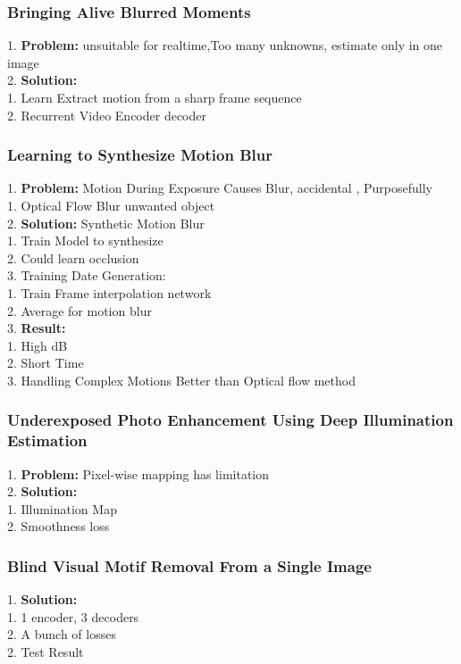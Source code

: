 \subsubsection{Bringing Alive Blurred Moments}
    1. {\bf Problem:} unsuitable for realtime,Too many unknowns, estimate only in one image \\
    2. {\bf Solution:} \\
        1. Learn Extract motion from a sharp frame sequence \\
        2. Recurrent Video Encoder decoder \\
\subsubsection{Learning to Synthesize Motion Blur}
    1. {\bf Problem:} Motion During Exposure Causes Blur, accidental , Purposefully  \\
        1. Optical Flow Blur unwanted object  \\
    2. {\bf Solution:} Synthetic Motion Blur \\
        1. Train Model to synthesize \\
        2. Could learn occlusion \\
        3. Training Date Generation: \\
            1. Train Frame interpolation network \\
            2. Average for motion blur \\
    3. {\bf Result:} \\
        1. High dB \\
        2. Short Time \\
        3. Handling Complex Motions Better than Optical flow method \\
\subsubsection{Underexposed Photo Enhancement Using Deep Illumination Estimation}
    1. {\bf Problem:} Pixel-wise mapping has limitation \\
    2. {\bf Solution:}  \\
        1. Illumination Map \\
        2. Smoothness loss \\
\subsubsection{Blind Visual Motif Removal From a Single Image}
    1. {\bf Solution:}  \\
        1. 1 encoder, 3 decoders \\
        2. A bunch of losses \\
    2. Test Result \\
